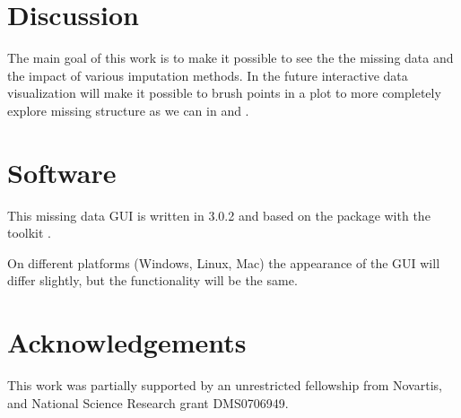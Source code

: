 \documentclass[article]{jss}
\begin{document}
\section{Discussion}

The main goal of this work is to make it possible to see the the missing data and the impact of various imputation methods. In the future interactive data visualization will make it possible to brush points in a plot to more completely explore missing structure as we can in  and .


\section*{Software}

This missing data GUI is written in  3.0.2 \citep{r} and based on the package  \citep{gwidgets} with the toolkit . 

On different platforms (Windows, Linux, Mac) the appearance of the GUI will differ slightly, but the functionality will be the same.

\section*{Acknowledgements}

This work was partially supported by an unrestricted fellowship from Novartis, and National Science Research grant DMS0706949.


\end{document}
